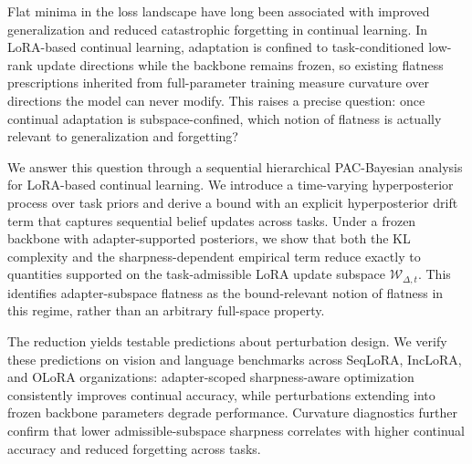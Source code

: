 Flat minima in the loss landscape have long been associated with improved generalization and reduced catastrophic forgetting in continual learning.
In LoRA-based continual learning, adaptation is confined to task-conditioned low-rank update directions while the backbone remains frozen, so existing flatness prescriptions inherited from full-parameter training measure curvature over directions the model can never modify.
This raises a precise question: once continual adaptation is subspace-confined, which notion of flatness is actually relevant to generalization and forgetting?

We answer this question through a sequential hierarchical PAC-Bayesian analysis for LoRA-based continual learning.
We introduce a time-varying hyperposterior process over task priors and derive a bound with an explicit hyperposterior drift term that captures sequential belief updates across tasks.
Under a frozen backbone with adapter-supported posteriors, we show that both the KL complexity and the sharpness-dependent empirical term reduce exactly to quantities supported on the task-admissible LoRA update subspace $\mathcal{W}_{\Delta,t}$.
This identifies adapter-subspace flatness as the bound-relevant notion of flatness in this regime, rather than an arbitrary full-space property.

The reduction yields testable predictions about perturbation design.
We verify these predictions on vision and language benchmarks across SeqLoRA, IncLoRA, and OLoRA organizations: adapter-scoped sharpness-aware optimization consistently improves continual accuracy, while perturbations extending into frozen backbone parameters degrade performance.
Curvature diagnostics further confirm that lower admissible-subspace sharpness correlates with higher continual accuracy and reduced forgetting across tasks.
